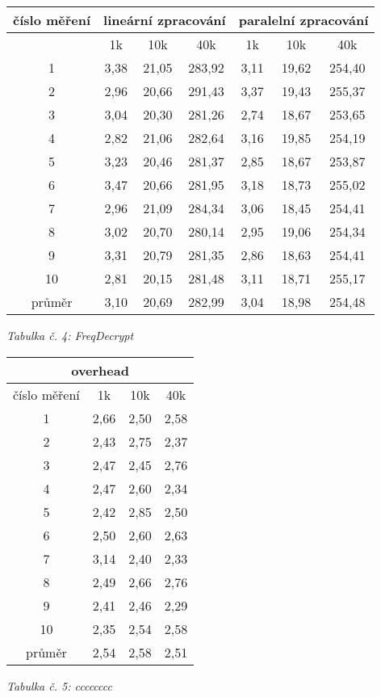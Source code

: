 \documentclass{article}
\begin{document}
\begin{center}
	\begin{tabular}{ c | c | c | c | c | c | c }
		\textbf{číslo měření} & \multicolumn{3}{c|}{\textbf{lineární zpracování}} & \multicolumn{3}{|c}{\textbf{paralelní zpracování}} \\
		\hline
		& 1k & 10k & 40k & 1k & 10k & 40k \\
		\hline
		\hline
		1 & 3,38 & 21,05 & 283,92 & 3,11 & 19,62 & 254,40 \\
		\hline
		2 & 2,96 & 20,66 & 291,43 & 3,37 & 19,43 & 255,37 \\
		\hline
		3 & 3,04 & 20,30 & 281,26 & 2,74 & 18,67 & 253,65 \\
		\hline
		4 & 2,82 & 21,06 & 282,64 & 3,16 & 19,85 & 254,19 \\
		\hline
		5 & 3,23 & 20,46 & 281,37 & 2,85 & 18,67 & 253,87 \\
		\hline
		6 & 3,47 & 20,66 & 281,95 & 3,18 & 18,73 & 255,02 \\
		\hline
		7 & 2,96 & 21,09 & 284,34 & 3,06 & 18,45 & 254,41 \\
		\hline
		8 & 3,02 & 20,70 & 280,14 & 2,95 & 19,06 & 254,34 \\
		\hline
		9 & 3,31 & 20,79 & 281,35 & 2,86 & 18,63 & 254,41 \\
		\hline
		10 & 2,81 & 20,15 & 281,48 & 3,11 & 18,71 & 255,17 \\
		\hline
		průměr & 3,10 & 20,69 & 282,99 & 3,04 & 18,98 & 254,48 \\
	\end{tabular}
	\newline
	\textit{Tabulka č. 4: FreqDecrypt}
\end{center}

\begin{center}
	\begin{tabular}{ c | c | c | c }
		\multicolumn{4}{c}{\textbf{overhead}} \\
		\hline
		číslo měření & 1k & 10k & 40k \\
		\hline
		\hline
		1 & 2,66 & 2,50 & 2,58 \\
		\hline
		2 & 2,43 & 2,75 & 2,37 \\
		\hline
		3 & 2,47 & 2,45 & 2,76 \\
		\hline
		4 & 2,47 & 2,60 & 2,34 \\
		\hline
		5 & 2,42 & 2,85 & 2,50 \\
		\hline
		6 & 2,50 & 2,60 & 2,63 \\
		\hline
		7 & 3,14 & 2,40 & 2,33 \\
		\hline
		8 & 2,49 & 2,66 & 2,76 \\
		\hline
		9 & 2,41 & 2,46 & 2,29 \\
		\hline
		10 & 2,35 & 2,54 & 2,58 \\
		\hline
		průměr & 2,54 & 2,58 & 2,51 \\
	\end{tabular}
	\newline
	\textit{Tabulka č. 5: cccccccc}
\end{center}
\end{document}
